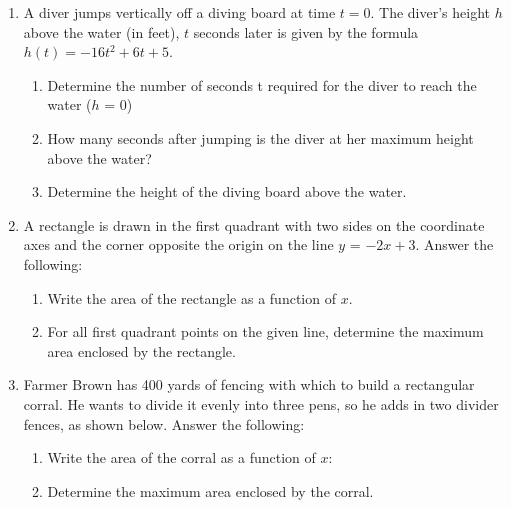 \begin{enumerate}
\newpage
\item A diver jumps vertically off a diving board at time $t = 0$. The diver's height $h$ above the water (in feet), $t$ seconds later is given by the formula $h(t) = -16t^2 + 6t + 5$. 
\begin{enumerate}
\item Determine the number of seconds t required for the diver to reach the water ($h$ = 0)
\item How many seconds after jumping is the diver at her maximum height above the water?
\item Determine the height of the diving board above the water.
\end{enumerate}

\vfill\vfill

\newpage

\item A rectangle is drawn in the first quadrant with two sides on the coordinate axes and the corner opposite the origin on the line $y$ = $-2x+3$.  Answer the following:
\begin{enumerate}
\item Write the area of the rectangle as a function of $x$.
\item For all first quadrant points on the given line, determine the maximum area enclosed by the rectangle.
\end{enumerate}

\vfill

\item Farmer Brown has 400 yards of fencing with which to build a rectangular corral. He wants to divide it evenly into three pens, so he adds in two divider fences, as shown below. Answer the following:


\begin{enumerate}
\item Write the area of the corral as a function of $x$: 
\item Determine the maximum area enclosed by the corral.
\end{enumerate}


\end{enumerate}
